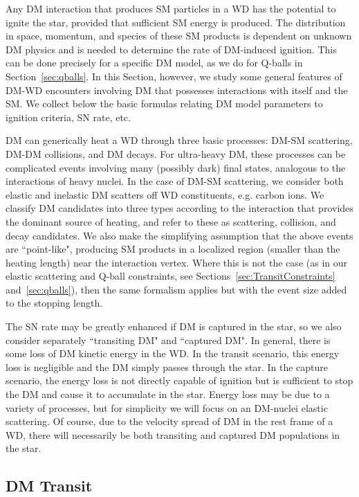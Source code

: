 Any DM interaction that produces SM particles in a WD has the potential to ignite the star, provided that sufficient SM energy is produced.
The distribution in space, momentum, and species of these SM products is dependent on unknown DM physics and is needed to determine the rate of DM-induced ignition.
This can be done precisely for a specific DM model, as we do for Q-balls in Section~\ref{sec:qballs}.
In this Section, however, we study some general features of DM-WD encounters involving DM that possesses interactions with itself and the SM.
We collect below the basic formulas relating DM model parameters to ignition criteria, SN rate, etc.

DM can generically heat a WD through three basic processes: DM-SM scattering, DM-DM collisions, and DM decays.
For ultra-heavy DM, these processes can be complicated events involving many (possibly dark) final states, analogous to the interactions of heavy nuclei.
In the case of DM-SM scattering, we consider both elastic and inelastic DM scatters off WD constituents, e.g. carbon ions.
We classify DM candidates into three types according to the interaction that provides the dominant source of heating, and refer to these as scattering, collision, and decay candidates.
We also make the simplifying assumption that the above events are ``point-like", producing SM products in a localized region (smaller than the heating length) near the interaction vertex.
Where this is not the case (as in our elastic scattering and Q-ball constraints, see Sections~\ref{sec:TransitConstraints} and~\ref{sec:qballs}), then the same formalism applies but with the event size added to the stopping length.

The SN rate may be greatly enhanced if DM is captured in the star, so we also consider separately ``transiting DM" and ``captured DM".
In general, there is some loss of DM kinetic energy in the WD.
In the transit scenario, this energy loss is negligible and the DM simply passes through the star.
In the capture scenario, the energy loss is not directly capable of ignition but is sufficient to stop the DM and cause it to accumulate in the star.
Energy loss may be due to a variety of processes, but for simplicity we will focus on an DM-nuclei elastic scattering.
Of course, due to the velocity spread of DM in the rest frame of a WD, there will necessarily be both transiting and captured DM populations in the star.

\subsection{DM Transit}

